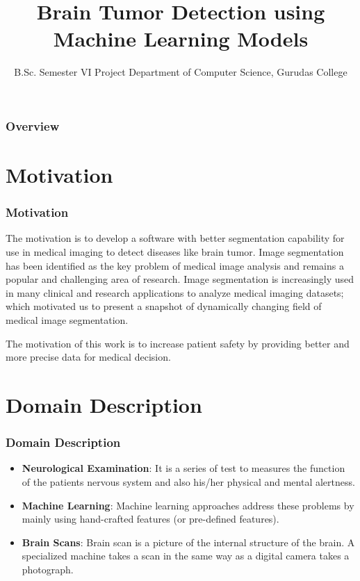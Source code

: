 \documentclass[10pt, aspectratio=169]{beamer}
\title{Brain Tumor Detection using Machine Learning Models}
\subtitle{B.Sc. Semester VI Project \newline Department of Computer Science, Gurudas College}
\date{}
\author[Rajarshi, Bhargav, Soptorshi, Brahmajit] {
	Bhargav Basu \texorpdfstring{\\} \and
	Soptorshi Bhattacharjee \texorpdfstring{\\} \and
	Brahmajit Das \texorpdfstring{\\} \and
	Rajarshi Sardar
}
\institute[Gurudas College]{Gurudas College, Calcutta University}
\begin{document}
	\frame{\titlepage}

	\begin{frame}
		\frametitle{Overview}
		\tableofcontents
	\end{frame}

	\section{Motivation}
	\begin{frame}
		\frametitle{Motivation}

		The motivation is to develop a software with better segmentation
		capability for use in medical imaging to detect diseases like brain
		tumor. Image segmentation has been identified as the key problem of
		medical image analysis and remains a popular and challenging area of
		research. Image segmentation is increasingly used in many clinical and
		research applications to analyze medical imaging datasets; which
		motivated us to present a snapshot of dynamically changing field of
		medical image segmentation.

		\vspace{0.5cm}

		The motivation of this work is to increase patient safety by providing
		better and more precise data for medical decision.
	\end{frame}

	\section{Domain Description}

	\begin{frame}
		\frametitle{Domain Description}

		\begin{itemize}
			\item
			\textbf{Neurological Examination}: It is a series of test to measures
			the function of the patients nervous system and also his/her physical
			and mental alertness. \pause
			\item
			\textbf{Machine Learning}: Machine learning approaches address these
			problems by mainly using hand-crafted features (or pre-defined
			features). \pause
		   \item
		   \textbf{Brain Scans}: Brain scan is a picture of the internal
		   structure of the brain. A specialized machine takes a scan in the
		   same way as a digital camera takes a photograph.
		\end{itemize}
	\end{frame}
\end{document}
